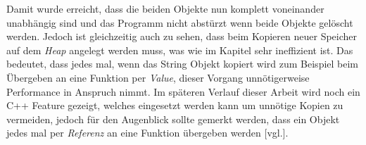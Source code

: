 Damit wurde erreicht, dass die beiden Objekte nun komplett voneinander unabhängig sind und das
Programm nicht abstürzt wenn beide Objekte gelöscht werden.
\newline
\newline
Jedoch ist gleichzeitig auch zu sehen, dass beim Kopieren neuer Speicher auf dem \emph{Heap}
angelegt werden muss, was wie im Kapitel \emph{} sehr ineffizient ist. Das
bedeutet, dass jedes mal, wenn das String Objekt kopiert wird zum Beispiel beim Übergeben an eine
Funktion per \emph{Value}, dieser Vorgang unnötigerweise Performance in Anspruch nimmt. Im
späteren Verlauf dieser Arbeit wird noch ein C++ Feature gezeigt, welches eingesetzt werden kann
um unnötige Kopien zu vermeiden, jedoch für den Augenblick sollte gemerkt werden, dass ein Objekt
jedes mal per \emph{Referenz} an eine Funktion übergeben werden \cite{ChernoCopy}[vgl.].